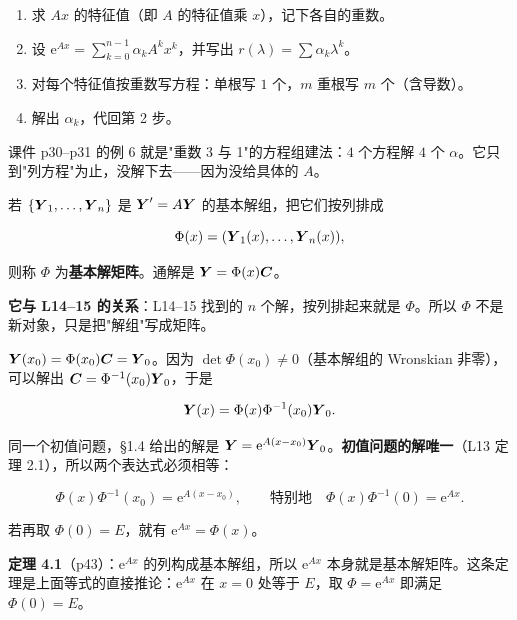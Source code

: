 \documentclass[11pt]{ctexart}
\begin{document}

\begin{enumerate}
  \item 求 $Ax$ 的特征值（即 $A$ 的特征值乘 $x$），记下各自的重数。
  \item 设 $\mathrm{e}^{Ax}=\sum_{k=0}^{n-1}\alpha_kA^kx^k$，并写出 $r(\lambda)=\sum\alpha_k\lambda^k$。
  \item 对每个特征值按重数写方程：单根写 $1$ 个，$m$ 重根写 $m$ 个（含导数）。
  \item 解出 $\alpha_k$，代回第 2 步。
\end{enumerate}

课件 p30--p31 的例 6 就是"重数 3 与 1"的方程组建法：$4$ 个方程解 $4$ 个 $\alpha$。它只到"列方程"为止，没解下去——因为没给具体的 $A$。



若 $\{\boldsymbol{Y}_1,\dots,\boldsymbol{Y}_n\}$ 是 $\boldsymbol{Y}'=A\boldsymbol{Y}$ 的基本解组，把它们按列排成

\[
\Phi(x)=(\boldsymbol{Y}_1(x),\dots,\boldsymbol{Y}_n(x)),
\]

则称 $\Phi$ 为\textbf{基本解矩阵}。通解是 $\boldsymbol{Y}=\Phi(x)\boldsymbol{C}$。

\textbf{它与 L14--15 的关系}：L14--15 找到的 $n$ 个解，按列排起来就是 $\Phi$。所以 $\Phi$ 不是新对象，只是把"解组"写成矩阵。


$\boldsymbol{Y}(x_0)=\Phi(x_0)\boldsymbol{C}=\boldsymbol{Y}_0$。因为 $\det\Phi(x_0)\neq0$（基本解组的 Wronskian 非零），可以解出 $\boldsymbol{C}=\Phi^{-1}(x_0)\boldsymbol{Y}_0$，于是

\[
\boldsymbol{Y}(x)=\Phi(x)\Phi^{-1}(x_0)\boldsymbol{Y}_0 .
\]


同一个初值问题，§1.4 给出的解是 $\boldsymbol{Y}=\mathrm{e}^{A(x-x_0)}\boldsymbol{Y}_0$。\textbf{初值问题的解唯一}（L13 定理 2.1），所以两个表达式必须相等：

\[
\Phi(x)\Phi^{-1}(x_0)=\mathrm{e}^{A(x-x_0)},\qquad\text{特别地}\quad \Phi(x)\Phi^{-1}(0)=\mathrm{e}^{Ax}.
\]

若再取 $\Phi(0)=E$，就有 $\mathrm{e}^{Ax}=\Phi(x)$。

\textbf{定理 4.1}（p43）：$\mathrm{e}^{Ax}$ 的列构成基本解组，所以 $\mathrm{e}^{Ax}$ 本身就是基本解矩阵。这条定理是上面等式的直接推论：$\mathrm{e}^{Ax}$ 在 $x=0$ 处等于 $E$，取 $\Phi=\mathrm{e}^{Ax}$ 即满足 $\Phi(0)=E$。
\end{document}
